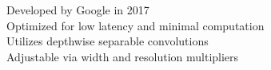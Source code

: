\documentclass[preview]{standalone}
\begin{document}
Developed by Google in 2017\\Optimized for low latency and minimal computation\\Utilizes depthwise separable convolutions\\Adjustable via width and resolution multipliers\\
\end{document}
